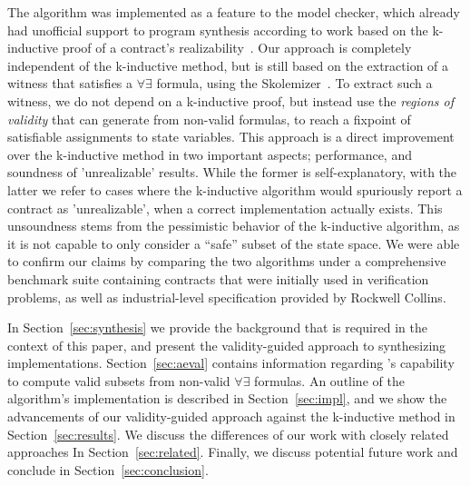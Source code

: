The algorithm was implemented as a feature to the \jkind model checker, which
already had unofficial support to program synthesis according to work based on
the k-inductive proof of a contract's
realizability~\cite{Katis15:Realizability,katis2016towards,katis2016synthesis}.
Our approach is completely independent of the k-inductive method, but is still
based on the extraction of a witness that satisfies a $\forall\exists$ formula, using the \aeval Skolemizer~\cite{fedyukovich2015automated}. To extract such a
witness, we do not depend on a k-inductive proof, but instead use the
\textit{regions of validity} that \aeval can generate from non-valid formulas,
to reach a fixpoint of satisfiable assignments to state variables.
This approach is a direct improvement over the k-inductive method in two
important aspects; performance, and soundness of 'unrealizable' results. While
the former is self-explanatory, with the latter we refer to cases where the
k-inductive algorithm would spuriously report a contract as 'unrealizable', when a correct
implementation actually exists. This unsoundness stems from the pessimistic
behavior of the k-inductive algorithm, as it is not capable to only consider a
``safe'' subset of the state space. We were able to confirm our claims
by comparing the two algorithms under a comprehensive benchmark suite containing
contracts that were initially used in verification problems, as well as
industrial-level specification provided by Rockwell Collins.

In Section~\ref{sec:synthesis} we provide the background that is required in the
context of this paper, and present the validity-guided approach to synthesizing
implementations. Section~\ref{sec:aeval} contains information regarding \aeval's
capability to compute valid subsets from non-valid $\forall\exists$ formulas.
An outline of the algorithm's implementation is described
in Section~\ref{sec:impl}, and we show the advancements of our validity-guided
approach against the k-inductive method in Section~\ref{sec:results}.
We discuss the differences of our work with closely related approaches In
Section~\ref{sec:related}. Finally, we discuss potential future work and
conclude in Section~\ref{sec:conclusion}.

